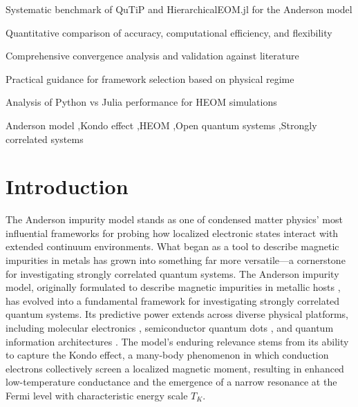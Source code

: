 \documentclass[preprint,1p]{elsarticle}
\begin{document}
\begin{frontmatter}

\begin{highlights}
\item Systematic benchmark of QuTiP and HierarchicalEOM.jl for the Anderson model
\item Quantitative comparison of accuracy, computational efficiency, and flexibility
\item Comprehensive convergence analysis and validation against literature
\item Practical guidance for framework selection based on physical regime
\item Analysis of Python vs Julia performance for HEOM simulations
\end{highlights}

\begin{keyword}
Anderson model \sep Kondo effect \sep HEOM \sep Open quantum systems \sep Strongly correlated systems
\end{keyword}
\end{frontmatter}


\section{Introduction}

The Anderson impurity model \cite{anderson1961localized} stands as one of condensed matter physics' most influential frameworks for probing how localized electronic states interact with extended continuum environments. What began as a tool to describe magnetic impurities in metals has grown into something far more versatile—a cornerstone for investigating strongly correlated quantum systems. The Anderson impurity model, originally formulated to describe magnetic impurities in metallic hosts \cite{anderson1961localized}, has evolved into a fundamental framework for investigating strongly correlated quantum systems. Its predictive power extends across diverse physical platforms, including molecular electronics \cite{park2000coulomb}, semiconductor quantum dots \cite{goldhaber2000kondo}, and quantum information architectures \cite{burkard2023semiconductor}. The model's enduring relevance stems from its ability to capture the Kondo effect, a many-body phenomenon in which conduction electrons collectively screen a localized magnetic moment, resulting in enhanced low-temperature conductance \cite{hewson1993kondo} and the emergence of a narrow resonance at the Fermi level with characteristic energy scale $T_K$​ \cite{kondo1964resistance}.
\end{document}
